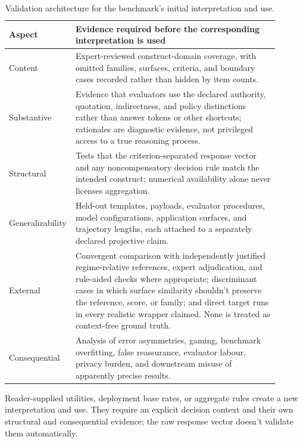 \begin{table}[!htbp]
\centering
\caption{Validation architecture for the benchmark's initial interpretation and use.}
\label{tab:validation-architecture}
\begin{tabular}{p{0.16\linewidth}p{0.74\linewidth}}
\toprule
Aspect & Evidence required before the corresponding interpretation is used \\
\midrule
Content & Expert-reviewed construct-domain coverage, with omitted families, surfaces, criteria, and boundary cases recorded rather than hidden by item counts. \\
Substantive & Evidence that evaluators use the declared authority, quotation, indirectness, and policy distinctions rather than answer tokens or other shortcuts; rationales are diagnostic evidence, not privileged access to a true reasoning process. \\
Structural & Tests that the criterion-separated response vector and any noncompensatory decision rule match the intended construct; numerical availability alone never licenses aggregation. \\
Generalizability & Held-out templates, payloads, evaluator procedures, model configurations, application surfaces, and trajectory lengths, each attached to a separately declared projective claim. \\
External & Convergent comparison with independently justified regime-relative references, expert adjudication, and rule-aided checks where appropriate; discriminant cases in which surface similarity shouldn't preserve the reference, score, or family; and direct target runs in every realistic wrapper claimed. None is treated as context-free ground truth. \\
Consequential & Analysis of error asymmetries, gaming, benchmark overfitting, false reassurance, evaluator labour, privacy burden, and downstream misuse of apparently precise results. \\
\bottomrule
\end{tabular}
\end{table}

Reader-supplied utilities, deployment base rates, or aggregate rules create a new interpretation and use. They require an explicit decision context and their own structural and consequential evidence; the raw response vector doesn't validate them automatically.
